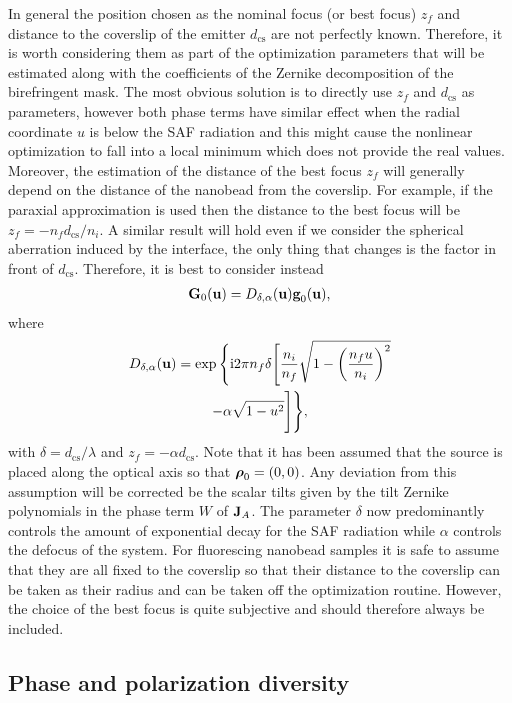 \documentclass[reprint,aps,pra,superscriptaddress,
amsmath,amssymb]{revtex4-1}
\begin{document}
In general the position chosen as the nominal focus (or best focus) $z_f$ and 
distance to the coverslip of the emitter $d_\text{cs} $ are not perfectly 
known. Therefore,
it is worth considering them as part of the optimization parameters that 
will be estimated along with the coefficients of the Zernike decomposition 
of the birefringent mask. The most obvious solution is to directly 
use $z_f$ and $d_{\text{cs}}$ as parameters, however both phase 
terms have similar effect when the 
radial coordinate $u$ is below the SAF radiation and this might cause the 
nonlinear optimization to fall into a local minimum which does not provide
the real values.
Moreover, the estimation 
of the distance of the best focus $z_f$ will generally depend on the distance 
of the nanobead from the coverslip. For example, if the paraxial 
approximation is used then the distance to the best focus will be 
$z_f = -n_f d_\text{cs} /n_i$. A similar result will hold even if we consider 
the spherical aberration induced by the interface, the only thing that changes 
is the factor in front of $d_\text{cs} $. Therefore, it is best to 
consider instead
\begin{align}
\textbf G_0  (\textbf u)  = D_{\delta, \alpha} (\textbf u) \textbf g_0 (\textbf u),
\end{align}
where
\begin{multline}
D_{\delta, \alpha} (\textbf u)= \exp \Bigg\{  
  \text{i} 2 \pi n_f  \delta \Bigg[ \frac{n_i}{n_f} 
  \sqrt{1 - \left(\frac{n_f u}{n_i} \right)^2 }  \\
- \alpha \sqrt{1 - u^2} \Bigg] \Bigg\} , 
\end{multline}
with $\delta = d_\text{cs} / \lambda$ and $z_f = -\alpha d_\text{cs}$. 
Note that it has been assumed that the source is placed  
 along the optical axis so that $\boldsymbol \rho_0 = (0,0)$. 
Any deviation from this assumption will be corrected be the scalar tilts 
given by the tilt Zernike polynomials in the phase term $W$ of $\textbf J_A$.
The parameter $\delta$ now predominantly controls the amount of exponential 
decay for the SAF radiation while $\alpha$ controls the defocus of the system. 
For fluorescing nanobead samples it is safe to 
assume that they are all fixed to the coverslip so that their distance to the 
coverslip can be taken as their radius and can be taken off the optimization
routine.  However, the choice of the best focus is quite subjective and should 
therefore always be included.


\subsection{Phase and polarization diversity}
\end{document}
